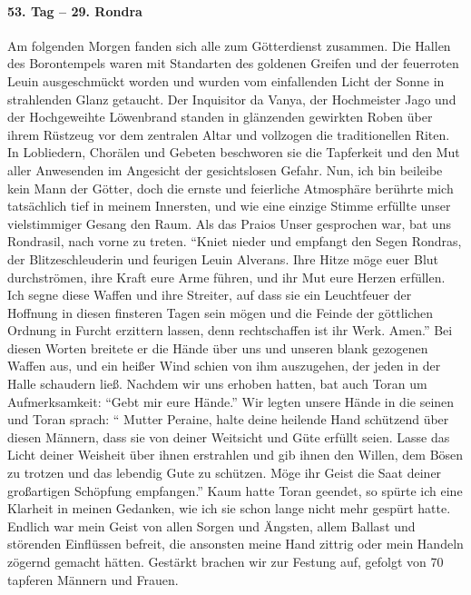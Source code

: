 \paragraph{53. Tag -- 29. Rondra}
Am folgenden Morgen fanden sich alle zum Götterdienst zusammen. Die Hallen des Borontempels waren mit Standarten des goldenen Greifen und der feuerroten Leuin ausgeschmückt worden und wurden vom einfallenden Licht der Sonne in strahlenden Glanz getaucht. Der Inquisitor da Vanya, der Hochmeister Jago und der Hochgeweihte Löwenbrand standen in glänzenden gewirkten Roben über ihrem Rüstzeug vor dem zentralen Altar und vollzogen die traditionellen Riten. In Lobliedern, Chorälen und Gebeten beschworen sie die Tapferkeit und den Mut aller Anwesenden im Angesicht der gesichtslosen Gefahr. Nun, ich bin beileibe kein Mann der Götter, doch die ernste und feierliche Atmosphäre berührte mich tatsächlich tief in meinem Innersten, und wie eine einzige Stimme erfüllte unser vielstimmiger Gesang den Raum. Als das Praios Unser gesprochen war, bat uns Rondrasil, nach vorne zu treten. ``Kniet nieder und empfangt den Segen Rondras, der Blitzeschleuderin und feurigen Leuin Alverans. Ihre Hitze möge euer Blut durchströmen, ihre Kraft eure Arme führen, und ihr Mut eure Herzen erfüllen. Ich segne diese Waffen und ihre Streiter, auf dass sie ein Leuchtfeuer der Hoffnung in diesen finsteren Tagen sein mögen und die Feinde der göttlichen Ordnung in Furcht erzittern lassen, denn rechtschaffen ist ihr Werk. Amen.'' Bei diesen Worten breitete er die Hände über uns und unseren blank gezogenen Waffen aus, und ein heißer Wind schien von ihm auszugehen, der jeden in der Halle schaudern ließ. Nachdem wir uns erhoben hatten, bat auch Toran um Aufmerksamkeit: ``Gebt mir eure Hände.'' Wir legten unsere Hände in die seinen und Toran sprach: `` Mutter Peraine, halte deine heilende Hand schützend über diesen Männern, dass sie von deiner Weitsicht und Güte erfüllt seien. Lasse das Licht deiner Weisheit über ihnen erstrahlen und gib ihnen den Willen, dem Bösen zu trotzen und das lebendig Gute zu schützen. Möge ihr Geist die Saat deiner großartigen Schöpfung empfangen.'' Kaum hatte Toran geendet, so spürte ich eine Klarheit in meinen Gedanken, wie ich sie schon lange nicht mehr gespürt hatte. Endlich war mein Geist von allen Sorgen und Ängsten, allem Ballast und störenden Einflüssen befreit, die ansonsten meine Hand zittrig oder mein Handeln zögernd gemacht hätten. Gestärkt brachen wir zur Festung auf, gefolgt von 70 tapferen Männern und Frauen.

